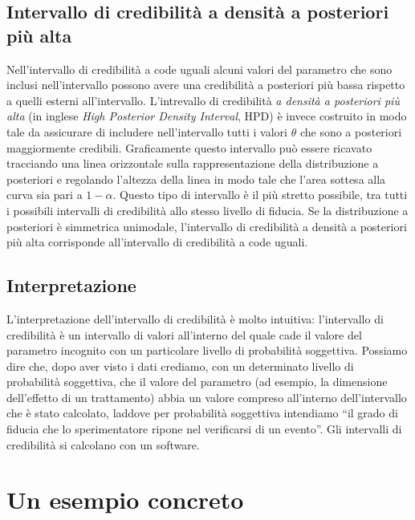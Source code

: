 \documentclass[
  11pt,
]{krantz}
\theoremstyle{definition}
\theoremstyle{definition}
\theoremstyle{definition}
\theoremstyle{definition}
\theoremstyle{remark}
\begin{document}
\hypertarget{intervallo-di-credibilituxe0-a-densituxe0-a-posteriori-piuxf9-alta}{%
\subsection{Intervallo di credibilità a densità a posteriori più alta}\label{intervallo-di-credibilituxe0-a-densituxe0-a-posteriori-piuxf9-alta}}

Nell'intervallo di credibilità a code uguali alcuni valori del parametro che sono inclusi nell'intervallo possono avere una credibilità a posteriori più bassa rispetto a quelli esterni all'intervallo. L'intrevallo di credibilità \emph{a densità a posteriori più alta} (in inglese \emph{High Posterior Density Interval}, HPD) è invece costruito in modo tale da assicurare di includere nell'intervallo tutti i valori \(\theta\) che sono a posteriori maggiormente credibili. Graficamente questo intervallo può essere ricavato tracciando una linea orizzontale sulla rappresentazione della distribuzione a posteriori e regolando l'altezza della linea in modo tale che l'area sottesa alla curva sia pari a \(1 - \alpha\). Questo tipo di intervallo è il più stretto possibile, tra tutti i possibili intervalli di credibilità allo stesso livello di fiducia. Se la distribuzione a posteriori è simmetrica unimodale, l'intervallo di credibilità a densità a posteriori più alta corrisponde all'intervallo di credibilità a code uguali.

\hypertarget{interpretazione}{%
\subsection{Interpretazione}\label{interpretazione}}

L'interpretazione dell'intervallo di credibilità è molto intuitiva: l'intervallo di credibilità è un intervallo di valori all'interno del quale cade il valore del parametro incognito con un particolare livello di probabilità soggettiva. Possiamo dire che, dopo aver visto i dati crediamo, con un determinato livello di probabilità soggettiva, che il valore del parametro (ad esempio, la dimensione dell'effetto di un trattamento) abbia un valore compreso all'interno dell'intervallo che è stato calcolato, laddove per probabilità soggettiva intendiamo ``il grado di fiducia che lo sperimentatore ripone nel verificarsi di un evento''. Gli intervalli di credibilità si calcolano con un software.

\hypertarget{un-esempio-concreto}{%
\section{Un esempio concreto}\label{un-esempio-concreto}}
\end{document}
